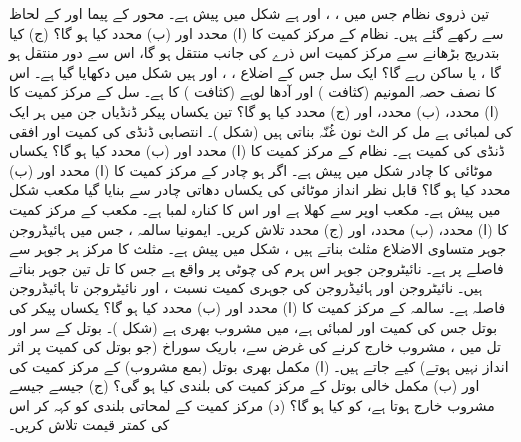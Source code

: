 تین ذروی نظام جس میں ، ، اور  ہے شکل  میں پیش ہے۔ محور کے  پیما  اور کے لحاظ سے رکھے گئے ہیں۔ نظام کے مرکز کمیت کا (ا)  محدد اور (ب)  محدد کیا ہو گا؟ (ج)  کیا  بتدریج بڑھانے سے مرکز کمیت  اس ذرے کی جانب منتقل ہو گا، اس سے دور منتقل ہو گا ، یا ساکن رہے گا؟
ایک سل جس  کے اضلاع ، ، اور  ہیں شکل  میں دکھایا گیا ہے۔ اس کا نصف حصہ  المونیم    (کثافت  ) اور آدھا لوہے (کثافت ) کا  ہے۔  سل کے مرکز کمیت کا (ا)  محدد، (ب)  محدد، اور (ج)  محدد کیا ہو گا؟
تین  یکساں پیکر   ڈنڈیاں جن میں ہر ایک کی لمبائی   ہے  مل کر  الٹ نون غُنّہ بناتی ہیں (شکل )۔ انتصابی ڈنڈی  کی کمیت   اور افقی ڈنڈی کی کمیت  ہے۔ نظام کے مرکز کمیت کا  (ا)   محدد اور (ب)  محدد کیا ہو گا؟
یکساں موٹائی کا  چادر شکل  میں پیش ہے۔ اگر  ہو چادر کے مرکز کمیت  کا (ا)  محدد اور (ب)  محدد کیا ہو گا؟
قابل نظر انداز موٹائی کی  یکساں  دھاتی چادر  سے بنایا گیا مکعب  شکل  میں پیش ہے۔ مکعب اوپر سے کھلا ہے اور اس کا کنارہ  لمبا  ہے۔ مکعب کے مرکز کمیت  کا  (ا)  محدد، (ب)  محدد، اور (ج)  محدد تلاش کریں۔
ایمونیا سالمہ    ، جس میں ہائیڈروجن جوہر      متساوی الاضلاع  مثلث  بناتے ہیں ، شکل  میں پیش ہے۔ مثلث کا مرکز ہر    جوہر سے   فاصلے پر ہے۔ نائیٹروجن جوہر  اس ہرم کی چوٹی پر واقع ہے جس کا   تل تین   جوہر بناتے ہیں۔ نائیٹروجن  اور  ہائیڈروجن  کی جوہری کمیت نسبت   ، اور نائیٹروجن تا ہائیڈروجن فاصلہ  ہے۔ سالمہ کے مرکز کمیت کا (ا)  محدد اور (ب)  محدد کیا ہو گا؟
 یکساں پیکر کی   بوتل  جس کی کمیت  اور  لمبائی   ہے، میں   مشروب بھری  ہے (شکل )۔ بوتل کے سر اور تل میں  ، مشروب  خارج کرنے کی غرض سے، باریک سوراخ (جو بوتل کی کمیت پر اثر انداز نہیں ہوتے)  کیے جاتے ہیں۔ (ا)  مکمل بھری بوتل (بمع مشروب) کے مرکز  کمیت   کی  اور  (ب) مکمل خالی بوتل کے مرکز کمیت کی بلندی   کیا ہو گی؟ (ج)  جیسے  جیسے مشروب  خارج ہوتا ہے،  کو کیا ہو گا؟ (د)  مرکز کمیت کے  لمحاتی بلندی کو  کہہ کر اس کی کمتر قیمت تلاش کریں۔
